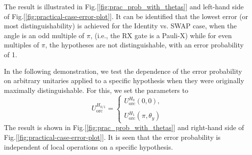 \documentclass[%
 aps,
 jmp,%
 amsmath,amssymb,
 reprint,%
]{revtex4-2}
\begin{document}
The result is illustrated in Fig.[\ref{fig:prac_prob_with_thetas}] and left-hand side of Fig.[\ref{fig:practical-case-error-plot}].
It can be identified that the lowest error (or most distinguishability) is achieved for the Identity vs. SWAP case, when the angle is an odd multiple of $\pi$, (i.e., the RX gate is a Pauli-X) while for even multiples of $\pi$, the hypotheses are not distinguishable, with an error probability of 1.

In the following demonstration, we test the dependence of the error probability on arbitrary unitaries applied to a specific hypothesis when they were originally maximally distinguishable.
For this, we set the parameters to
\begin{equation}
U_\textrm{orc}^{H_{0/1}} = 
\begin{cases}
U_\textrm{orc}^{H_{0}}(0,0), \\\\
U_\textrm{orc}^{H_{1}}(\pi,\theta_y)
\end{cases}
\label{eq:alternate-hypothesis-theta-y}
\end{equation}
The result is shown in Fig.[\ref{fig:prac_prob_with_thetas}] and right-hand side of Fig.[\ref{fig:practical-case-error-plot}].
It is seen that the error probability is independent of local operations on a specific hypothesis.





\end{document}
